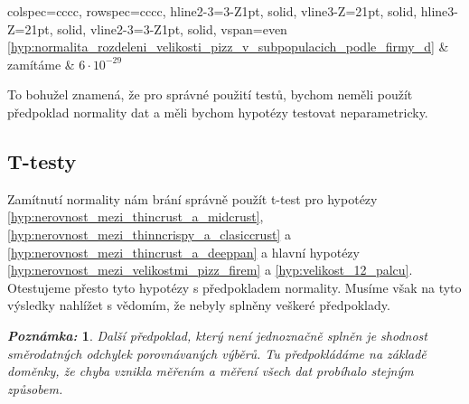 \documentclass[czech]{article}
\newtheorem*{note}{\textsl{Poznámka:}}
\begin{document}
\begin{table}[H]
\begin{tblr}{
			colspec={cccc},
			rowspec={cccc},
			hline{2-3}={3-Z}{1pt, solid},
			vline{3-Z}={2}{1pt, solid},
			hline{3-Z}={2}{1pt, solid},
			vline{2-3}={3-Z}{1pt, solid},
			vspan=even
		}
{{				\ref{hyp:normalita_rozdeleni_velikosti_pizz_v_subpopulacich_podle_firmy_d}}}
		                                                      &  zamítáme
		                                                      &  $6\cdot10^{-29}$                                                                                                                                                     \\
	\end{tblr}
	\caption{\emph{Pearsonův chí-kvadrát test} pro hypotézy normality
		\ref{hyp:normalita_rozdeleni_velikosti_pizz_pro_firmu_eagle_boys_v_subpopulacich_podle_typu_kurky},
		\ref{hyp:normalita_rozdeleni_velikosti_pizz_pro_firmu_dominos_v_subpopulacich_podle_typu_kurky} a
		\ref{hyp:normalita_rozdeleni_velikosti_pizz_v_subpopulacich_podle_firmy}}
\end{table}

To bohužel znamená, že pro správné použití testů, bychom neměli použít předpoklad normality dat a měli bychom hypotézy testovat neparametricky.

\subsection{T-testy}%
\label{sub:t-testy}
Zamítnutí normality nám brání správně použít t-test pro hypotézy
\ref{hyp:nerovnost_mezi_thincrust_a_midcrust}, \ref{hyp:nerovnost_mezi_thinncrispy_a_clasiccrust} a
\ref{hyp:nerovnost_mezi_thincrust_a_deeppan} a hlavní hypotézy
\ref{hyp:nerovnost_mezi_velikostmi_pizz_firem} a \ref{hyp:velikost_12_palcu}. Otestujeme přesto tyto
hypotézy s předpokladem normality. Musíme však na tyto výsledky nahlížet s vědomím, že nebyly splněny
veškeré předpoklady.

\begin{note}
	Další předpoklad, který není jednoznačně splněn je shodnost směrodatných odchylek porovnávaných
	výběrů. Tu předpokládáme na základě doměnky, že chyba vznikla měřením a měření všech dat
	probíhalo stejným způsobem.
\end{note}
\end{document}
